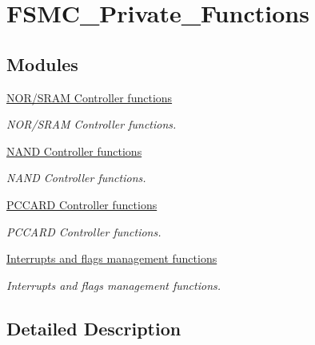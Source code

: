 \hypertarget{group___f_s_m_c___private___functions}{\section{F\-S\-M\-C\-\_\-\-Private\-\_\-\-Functions}
\label{group___f_s_m_c___private___functions}
}
\subsection*{Modules}
\begin{DoxyCompactItemize}
\item 
\hyperlink{group___f_s_m_c___group1}{N\-O\-R/\-S\-R\-A\-M Controller functions}
\begin{DoxyCompactList}\small\item\em N\-O\-R/\-S\-R\-A\-M Controller functions. \end{DoxyCompactList}\item 
\hyperlink{group___f_s_m_c___group2}{N\-A\-N\-D Controller functions}
\begin{DoxyCompactList}\small\item\em N\-A\-N\-D Controller functions. \end{DoxyCompactList}\item 
\hyperlink{group___f_s_m_c___group3}{P\-C\-C\-A\-R\-D Controller functions}
\begin{DoxyCompactList}\small\item\em P\-C\-C\-A\-R\-D Controller functions. \end{DoxyCompactList}\item 
\hyperlink{group___f_s_m_c___group4}{Interrupts and flags management functions}
\begin{DoxyCompactList}\small\item\em Interrupts and flags management functions. \end{DoxyCompactList}\end{DoxyCompactItemize}


\subsection{Detailed Description}
